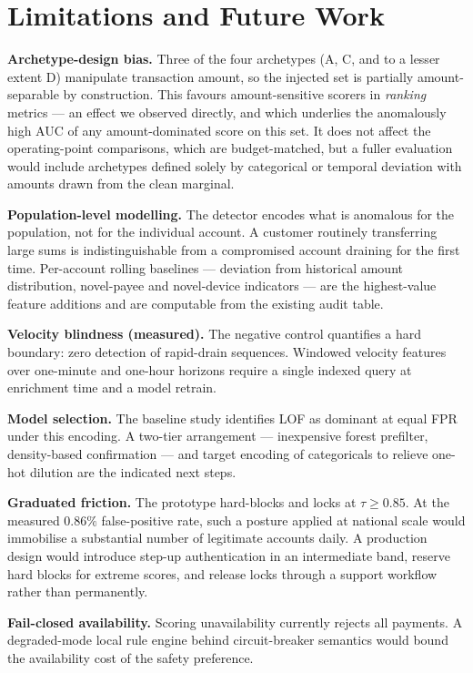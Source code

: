 \documentclass[conference]{IEEEtran}
\begin{document}
\section{Limitations and Future Work}
\label{sec:limits}

\textbf{Archetype-design bias.} Three of the four archetypes (A, C, and to a
lesser extent D) manipulate transaction amount, so the injected set is
partially amount-separable by construction. This favours amount-sensitive
scorers in \emph{ranking} metrics --- an effect we observed directly, and
which underlies the anomalously high AUC of any amount-dominated score on
this set. It does not affect the operating-point comparisons, which are
budget-matched, but a fuller evaluation would include archetypes defined
solely by categorical or temporal deviation with amounts drawn from the
clean marginal.

\textbf{Population-level modelling.} The detector encodes what is anomalous
for the population, not for the individual account. A customer routinely
transferring large sums is indistinguishable from a compromised account
draining for the first time. Per-account rolling baselines --- deviation
from historical amount distribution, novel-payee and novel-device
indicators --- are the highest-value feature additions and are computable
from the existing audit table.

\textbf{Velocity blindness (measured).} The negative control quantifies a
hard boundary: zero detection of rapid-drain sequences. Windowed velocity
features over one-minute and one-hour horizons require a single indexed
query at enrichment time and a model retrain.

\textbf{Model selection.} The baseline study identifies LOF as dominant at
equal FPR under this encoding. A two-tier arrangement --- inexpensive forest
prefilter, density-based confirmation --- and target encoding of
categoricals to relieve one-hot dilution are the indicated next steps.

\textbf{Graduated friction.} The prototype hard-blocks and locks at
$\tau \geq 0.85$. At the measured $0.86\%$ false-positive rate, such a
posture applied at national scale would immobilise a substantial number of
legitimate accounts daily. A production design would introduce step-up
authentication in an intermediate band, reserve hard blocks for extreme
scores, and release locks through a support workflow rather than
permanently.

\textbf{Fail-closed availability.} Scoring unavailability currently rejects
all payments. A degraded-mode local rule engine behind circuit-breaker
semantics would bound the availability cost of the safety preference.
\end{document}
